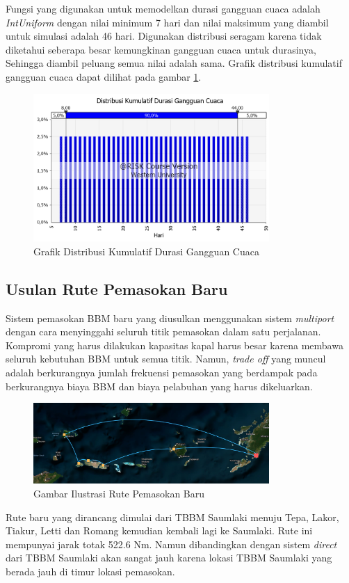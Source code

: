 Fungsi yang digunakan untuk memodelkan durasi gangguan cuaca adalah \emph{IntUniform} dengan nilai minimum 7 hari dan nilai maksimum yang diambil untuk simulasi adalah 46 hari. Digunakan distribusi seragam karena tidak diketahui seberapa besar kemungkinan gangguan cuaca untuk durasinya, Sehingga diambil peluang semua nilai adalah sama. Grafik distribusi kumulatif gangguan cuaca dapat dilihat pada gambar \ref{fig:grafik-kumulatif-durasi-gangguan-cuaca-1st}.

\begin{figure}[htbp!]
    \centering
    \includegraphics[width=0.8\textwidth]{gambar/graf-kumulatif-cuaca-awal.png}
    \caption{Grafik Distribusi Kumulatif Durasi Gangguan Cuaca}
    \label{fig:grafik-kumulatif-durasi-gangguan-cuaca-1st}
\end{figure}

\subsection{Usulan Rute Pemasokan Baru}
\label{subsec:usulan-rute-baru}

    Sistem pemasokan BBM baru yang diusulkan menggunakan sistem \emph{multiport} dengan cara menyinggahi seluruh titik pemasokan dalam satu perjalanan. Kompromi yang harus dilakukan kapasitas kapal harus besar karena membawa seluruh kebutuhan BBM untuk semua titik. Namun, \emph{trade off} yang muncul adalah berkurangnya jumlah frekuensi pemasokan yang berdampak pada berkurangnya biaya BBM dan biaya pelabuhan yang harus dikeluarkan.

\begin{figure}[htbp!]
    \centering
    \includegraphics[width=0.8\textwidth]{gambar/rute-baru.png}
    \caption{Gambar Ilustrasi Rute Pemasokan Baru}
    \label{fig:rute-baru}
\end{figure}

    Rute baru yang dirancang dimulai dari TBBM Saumlaki menuju Tepa, Lakor, Tiakur, Letti dan Romang kemudian kembali lagi ke Saumlaki. Rute ini mempunyai jarak totak 522.6 Nm. Namun dibandingkan dengan sistem \emph{direct} dari TBBM Saumlaki akan sangat jauh karena lokasi TBBM Saumlaki yang berada jauh di timur lokasi pemasokan.